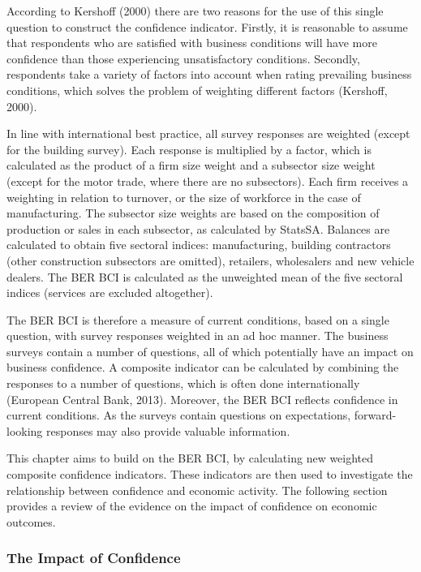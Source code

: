 \documentclass[11pt,]{article}
\begin{document}
According to Kershoff (2000) there are two reasons for the use of this
single question to construct the confidence indicator. Firstly, it is
reasonable to assume that respondents who are satisfied with business
conditions will have more confidence than those experiencing
unsatisfactory conditions. Secondly, respondents take a variety of
factors into account when rating prevailing business conditions, which
solves the problem of weighting different factors (Kershoff, 2000).

In line with international best practice, all survey responses are
weighted (except for the building survey). Each response is multiplied
by a factor, which is calculated as the product of a firm size weight
and a subsector size weight (except for the motor trade, where there are
no subsectors). Each firm receives a weighting in relation to turnover,
or the size of workforce in the case of manufacturing. The subsector
size weights are based on the composition of production or sales in each
subsector, as calculated by StatsSA. Balances are calculated to obtain
five sectoral indices: manufacturing, building contractors (other
construction subsectors are omitted), retailers, wholesalers and new
vehicle dealers. The BER BCI is calculated as the unweighted mean of the
five sectoral indices (services are excluded altogether).

The BER BCI is therefore a measure of current conditions, based on a
single question, with survey responses weighted in an ad hoc manner. The
business surveys contain a number of questions, all of which potentially
have an impact on business confidence. A composite indicator can be
calculated by combining the responses to a number of questions, which is
often done internationally (European Central Bank, 2013). Moreover, the
BER BCI reflects confidence in current conditions. As the surveys
contain questions on expectations, forward-looking responses may also
provide valuable information.

This chapter aims to build on the BER BCI, by calculating new weighted
composite confidence indicators. These indicators are then used to
investigate the relationship between confidence and economic activity.
The following section provides a review of the evidence on the impact of
confidence on economic outcomes.

\subsubsection{The Impact of Confidence}\label{the-impact-of-confidence}
\end{document}
